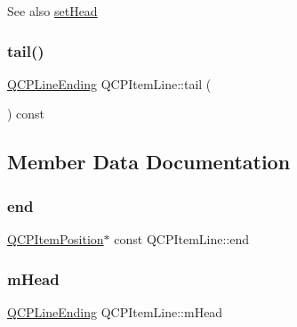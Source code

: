 \begin{DoxySeeAlso}{See also}
\mbox{\hyperlink{class_q_c_p_item_line_aebf3d687114d584e0459db6759e2c3c3}{set\+Head}} 
\end{DoxySeeAlso}
\mbox{\label{class_q_c_p_item_line_ac085d3939ec11d7a4d592dc2ed578360}} 
\subsubsection{\texorpdfstring{tail()}{tail()}}
{\footnotesize\ttfamily \mbox{\hyperlink{class_q_c_p_line_ending}{Q\+C\+P\+Line\+Ending}} Q\+C\+P\+Item\+Line\+::tail (\begin{DoxyParamCaption}{ }\end{DoxyParamCaption}) const\hspace{0.3cm}{\ttfamily [inline]}}



\subsection{Member Data Documentation}
\mbox{\label{class_q_c_p_item_line_a15598864c1c22a2497a1979c4980c4e1}} 
\subsubsection{\texorpdfstring{end}{end}}
{\footnotesize\ttfamily \mbox{\hyperlink{class_q_c_p_item_position}{Q\+C\+P\+Item\+Position}}$\ast$ const Q\+C\+P\+Item\+Line\+::end}

\mbox{\label{class_q_c_p_item_line_a51603f28ab7ddb1c1a95ea384791d3ed}} 
\subsubsection{\texorpdfstring{mHead}{mHead}}
{\footnotesize\ttfamily \mbox{\hyperlink{class_q_c_p_line_ending}{Q\+C\+P\+Line\+Ending}} Q\+C\+P\+Item\+Line\+::m\+Head\hspace{0.3cm}{\ttfamily [protected]}}

\mbox{\label{class_q_c_p_item_line_abbb544d5bb927dfe4e81a7f3ca4c65ac}} 
